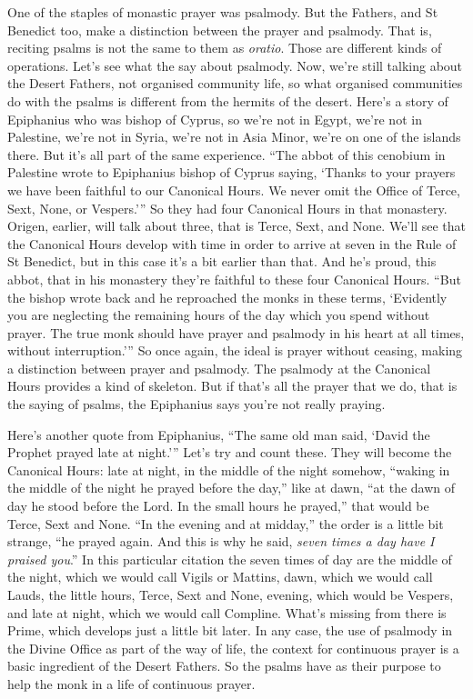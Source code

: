 One of the staples of monastic prayer was psalmody. But the Fathers, and St Benedict too, make a distinction between the prayer and psalmody. That is, reciting psalms is not the same to them as \emph{oratio}. Those are different kinds of operations. Let's see what the say about psalmody. Now, we're still talking about the Desert Fathers, not organised community life, so what organised communities do with the psalms is different from the hermits of the desert. Here's a story of Epiphanius who was bishop of Cyprus, so we're not in Egypt, we're not in Palestine, we're not in Syria, we're not in Asia Minor, we're on one of the islands there. But it's all part of the same experience. ``The abbot of this cenobium in Palestine wrote to Epiphanius bishop of Cyprus saying, `Thanks to your prayers we have been faithful to our Canonical Hours. We never omit the Office of Terce, Sext, None, or Vespers.''' So they had four Canonical Hours in that monastery. Origen, earlier, will talk about three, that is Terce, Sext, and None. We'll see that the Canonical Hours develop with time in order to arrive at seven in the Rule of St Benedict, but in this case it's a bit earlier than that. And he's proud, this abbot, that in his monastery they're faithful to these four Canonical Hours. ``But the bishop wrote back and he reproached the monks in these terms, `Evidently you are neglecting the remaining hours of the day which you spend without prayer. The true monk should have prayer and psalmody in his heart at all times, without interruption.''' So once again, the ideal is prayer without ceasing, making a distinction between prayer and psalmody. The psalmody at the Canonical Hours provides a kind of skeleton. But if that's all the prayer that we do, that is the saying of psalms, the Epiphanius says you're not really praying.

Here's another quote from Epiphanius, ``The same old man said, `David the Prophet prayed late at night.''' Let's try and count these. They will become the Canonical Hours: late at night, in the middle of the night somehow, ``waking in the middle of the night he prayed before the day,'' like at dawn, ``at the dawn of day he stood before the Lord. In the small hours he prayed,'' that would be Terce, Sext and None. ``In the evening and at midday,'' the order is a little bit strange, ``he prayed again. And this is why he said, \emph{seven times a day have I praised you}.'' In this particular citation the seven times of day are the middle of the night, which we would call Vigils or Mattins, dawn, which we would call Lauds, the little hours, Terce, Sext and None, evening, which would be Vespers, and late at night, which we would call Compline. What's missing from there is Prime, which develops just a little bit later. In any case, the use of psalmody in the Divine Office as part of the way of life, the context for continuous prayer is a basic ingredient of the Desert Fathers. So the psalms have as their purpose to help the monk in a life of continuous prayer.

